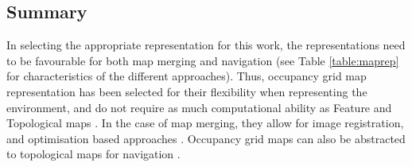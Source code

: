 \subsection{Summary}
In selecting the appropriate representation for this work, the representations need to be favourable for both map merging and navigation (see Table \ref{table:maprep} for characteristics of the different approaches). Thus, occupancy grid map representation has been selected for their flexibility when representing the environment, and do not require as much computational ability as Feature and Topological maps \cite{Thrun2006}. In the case of map merging, they allow for image registration, and optimisation based approaches \cite{Saeedi}. Occupancy grid maps can also be abstracted to topological maps for navigation \cite{Saeedi}.
